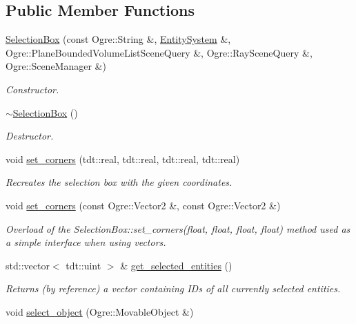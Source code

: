 \subsection*{Public Member Functions}
\begin{DoxyCompactItemize}
\item 
\hyperlink{class_selection_box_a4f133c8badc39fb16a58188e7bd81399}{Selection\+Box} (const Ogre\+::\+String \&, \hyperlink{class_entity_system}{Entity\+System} \&, Ogre\+::\+Plane\+Bounded\+Volume\+List\+Scene\+Query \&, Ogre\+::\+Ray\+Scene\+Query \&, Ogre\+::\+Scene\+Manager \&)
\begin{DoxyCompactList}\small\item\em Constructor. \end{DoxyCompactList}\item 
\hyperlink{class_selection_box_ad7ca81556a52cdd7f21422331a845ef9}{$\sim$\+Selection\+Box} ()
\begin{DoxyCompactList}\small\item\em Destructor. \end{DoxyCompactList}\item 
void \hyperlink{class_selection_box_adcded0c1617213d702126920e117ba33}{set\+\_\+corners} (tdt\+::real, tdt\+::real, tdt\+::real, tdt\+::real)
\begin{DoxyCompactList}\small\item\em Recreates the selection box with the given coordinates. \end{DoxyCompactList}\item 
void \hyperlink{class_selection_box_ac8545c527a1fd5c28de1efd436765f5e}{set\+\_\+corners} (const Ogre\+::\+Vector2 \&, const Ogre\+::\+Vector2 \&)
\begin{DoxyCompactList}\small\item\em Overload of the Selection\+Box\+::set\+\_\+corners(float, float, float, float) method used as a simple interface when using vectors. \end{DoxyCompactList}\item 
std\+::vector$<$ tdt\+::uint $>$ \& \hyperlink{class_selection_box_a9f4c4958798dedb1cf97737e605408eb}{get\+\_\+selected\+\_\+entities} ()
\begin{DoxyCompactList}\small\item\em Returns (by reference) a vector containing ID\textquotesingle{}s of all currently selected entities. \end{DoxyCompactList}\item 
void \hyperlink{class_selection_box_a95cf76c371678c6f644f50577ee59c9f}{select\+\_\+object} (Ogre\+::\+Movable\+Object \&)

\end{DoxyCompactItemize}
